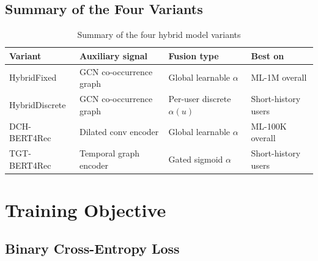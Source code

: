 \documentclass[12pt,a4paper]{report}
\begin{document}
\subsection{Summary of the Four Variants}

\begin{table}[h]
\centering
\caption{Summary of the four hybrid model variants}
\renewcommand{\arraystretch}{1.3}
\footnotesize
\begin{tabular}{p{3.2cm} p{3.2cm} p{3.2cm} p{2.8cm}}
\toprule
\textbf{Variant} & \textbf{Auxiliary signal} &
\textbf{Fusion type} & \textbf{Best on} \\
\midrule
HybridFixed     & GCN co-occurrence graph  & Global learnable $\alpha$ & ML-1M overall \\
HybridDiscrete  & GCN co-occurrence graph  & Per-user discrete $\alpha(u)$ & Short-history users \\
DCH-BERT4Rec    & Dilated conv encoder     & Global learnable $\alpha$ & ML-100K overall \\
TGT-BERT4Rec    & Temporal graph encoder   & Gated sigmoid $\alpha$   & Short-history users \\
\bottomrule
\end{tabular}
\end{table}

\section{Training Objective}

\subsection{Binary Cross-Entropy Loss}
\end{document}
